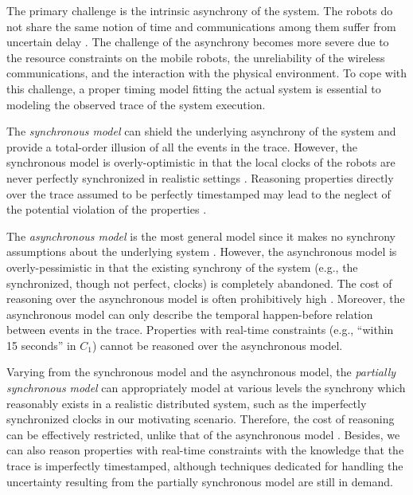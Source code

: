 \documentclass[10pt,conference,compsocconf,letterpaper]{IEEEtran}
\begin{document}
The primary challenge is the intrinsic asynchrony of the system. The robots do not share the same notion of time and communications among them suffer from uncertain delay \cite{Corbett12, Duggirala12, Stoller00, Kshemkalyani13}. The challenge of the asynchrony becomes more severe due to the resource constraints on the mobile robots, the unreliability of the wireless communications, and the interaction with the physical environment. To cope with this challenge, a proper timing model fitting the actual system is essential to modeling the observed trace of the system execution.

The \textit{synchronous model} can shield the underlying asynchrony of the system and provide a total-order illusion of all the events in the trace. However, the synchronous model is overly-optimistic in that the local clocks of the robots are never perfectly synchronized in realistic settings \cite{Duggirala12, Corbett12}. Reasoning properties directly over the trace assumed to be perfectly timestamped may lead to the neglect of the potential violation of the properties \cite{Kshemkalyani13}.

The \textit{asynchronous model} is the most general model since it makes no synchrony assumptions about the underlying system \cite{Gartner99}. However, the asynchronous model is overly-pessimistic in that the existing synchrony of the system (e.g., the synchronized, though not perfect, clocks) is completely abandoned. The cost of reasoning over the asynchronous model is often prohibitively high \cite{Yang13, Wei12}. Moreover, the asynchronous model can only describe the temporal happen-before relation between events in the trace. Properties with real-time constraints (e.g., ``within 15 seconds'' in $C_1$) cannot be reasoned over the asynchronous model.

Varying from the synchronous model and the asynchronous model, the \textit{partially synchronous model} can appropriately model at various levels the synchrony which reasonably exists in a realistic distributed system, such as the imperfectly synchronized clocks in our motivating scenario. Therefore, the cost of reasoning can be effectively restricted, unlike that of the asynchronous model \cite{Stoller00}. Besides, we can also reason properties with real-time constraints with the knowledge that the trace is imperfectly timestamped, although techniques dedicated for handling the uncertainty resulting from the partially synchronous model are still in demand.
\end{document}

